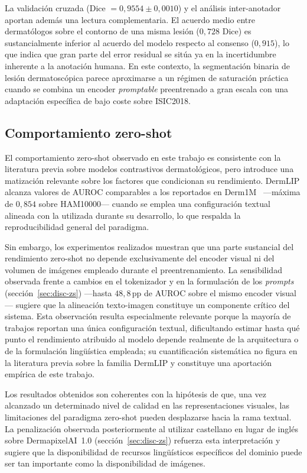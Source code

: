 La validación cruzada (Dice $= 0{,}9554 \pm 0{,}0010$) y el análisis
inter-anotador aportan además una lectura complementaria. El acuerdo
medio entre dermatólogos sobre el contorno de una misma lesión
($0{,}728$ Dice) es sustancialmente inferior al acuerdo del modelo
respecto al consenso ($0{,}915$), lo que indica que gran parte del error
residual se sitúa ya en la incertidumbre inherente a la anotación
humana. En este contexto, la segmentación binaria de lesión
dermatoscópica parece aproximarse a un régimen de saturación práctica
cuando se combina un encoder \emph{promptable} preentrenado a gran
escala con una adaptación específica de bajo coste sobre ISIC2018.

\subsection{Comportamiento zero-shot}
\label{sec:lit-zs}

El comportamiento zero-shot observado en este trabajo es consistente
con la literatura previa sobre modelos contrastivos dermatológicos,
pero introduce una matización relevante sobre los factores que
condicionan su rendimiento. DermLIP alcanza valores de AUROC
comparables a los reportados en Derm1M~\cite{derm1m} ---máxima de
$0{,}854$ sobre HAM10000--- cuando se emplea una configuración textual
alineada con la utilizada durante su desarrollo, lo que respalda la
reproducibilidad general del paradigma.

Sin embargo, los experimentos realizados muestran que una parte
sustancial del rendimiento zero-shot no depende exclusivamente del
encoder visual ni del volumen de imágenes empleado durante el
preentrenamiento. La sensibilidad observada frente a cambios en el
tokenizador y en la formulación de los \emph{prompts}
(sección~\ref{sec:disc-zs}) ---hasta $48{,}8$\,pp de AUROC sobre el
mismo encoder visual--- sugiere que la alineación texto-imagen
constituye un componente crítico del sistema. Esta observación resulta
especialmente relevante porque la mayoría de trabajos reportan una única
configuración textual, dificultando estimar hasta qué punto el
rendimiento atribuido al modelo depende realmente de la arquitectura o
de la formulación lingüística empleada; su cuantificación sistemática no
figura en la literatura previa sobre la familia DermLIP y constituye una
aportación empírica de este trabajo.

Los resultados obtenidos son coherentes con la hipótesis de que, una vez
alcanzado un determinado nivel de calidad en las representaciones
visuales, las limitaciones del paradigma zero-shot pueden desplazarse
hacia la rama textual. La penalización observada posteriormente al
utilizar castellano en lugar de inglés sobre DermapixelAI~1.0
(sección~\ref{sec:disc-zs}) refuerza esta interpretación y sugiere que
la disponibilidad de recursos lingüísticos específicos del dominio puede
ser tan importante como la disponibilidad de imágenes.

